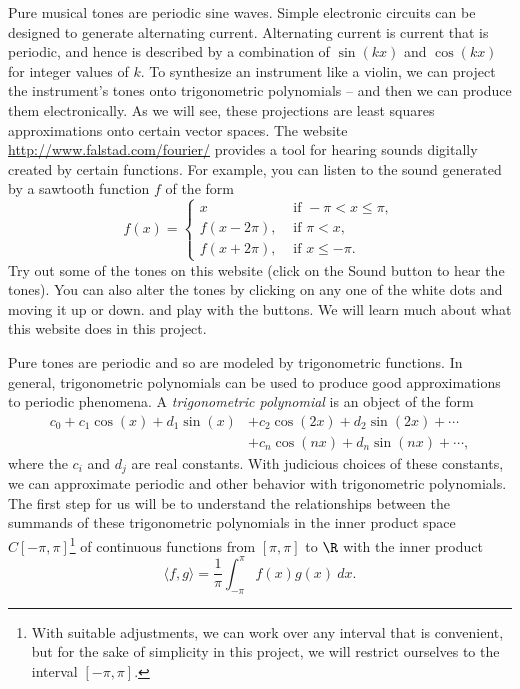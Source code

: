 Pure musical tones are periodic sine waves. Simple electronic circuits can be designed to generate alternating current. Alternating current is current that is periodic, and hence is described by a combination of $\sin(kx)$ and $\cos(kx)$ for integer values of $k$. To synthesize an instrument like a violin, we can project the instrument's tones onto trigonometric polynomials -- and then we can produce them electronically. As we will see, these projections are least squares approximations onto certain vector spaces.
The website \url{http://www.falstad.com/fourier/} provides a tool for hearing sounds digitally created by certain functions. For example, you can listen to the sound generated by a sawtooth function $f$ of the form
\[f(x) = \begin{cases}
x &\text{ if } -\pi < x \leq \pi, \\
f(x-2\pi), 	& \text{ if } \pi < x, \\	
f(x+2\pi), 	& \text{ if } x \leq -\pi.
\end{cases}\]
Try out some of the tones on this website (click on the Sound button to hear the tones). You can also alter the tones by clicking on any one of the white dots and moving it up or down.  and play with the buttons.  We will learn much about what this website does in this project.

Pure tones are periodic and so are modeled by trigonometric functions. In general, trigonometric polynomials can be used to produce good approximations to periodic phenomena. A \emph{trigonometric polynomial} is an object of the form
\begin{align*}
c_0 + c_1 \cos(x) + d_1\sin(x) &+ c_2\cos(2x) + d_2\sin(2x) + \cdots \\
	&+ c_n \cos(nx) + d_n \sin(nx) + \cdots,
\end{align*}
where the $c_i$ and $d_j$ are real constants. With judicious choices of these constants, we can approximate periodic and other behavior with trigonometric polynomials. The first step for us will be to understand the relationships between the summands of these trigonometric polynomials in the inner product space $C[-\pi, \pi]$\footnote{With suitable adjustments, we can work over any interval that is convenient, but for the sake of simplicity in this project, we will restrict ourselves to the interval $[-\pi, \pi]$.} of continuous functions from $[\pi, \pi]$ to $\R$ with the inner product
\begin{equation}
\langle f,g \rangle = \frac{1}{\pi} \int_{-\pi}^{\pi} f(x)g(x) \ dx. \label{eq:ip}
\end{equation}

